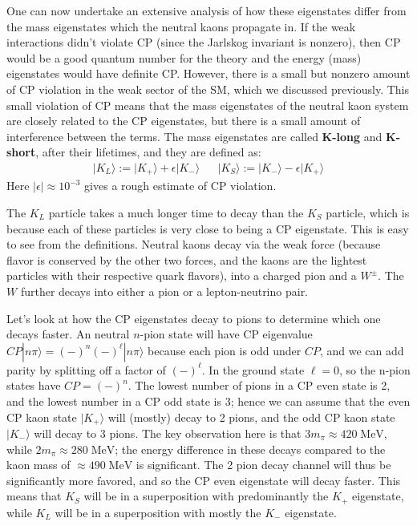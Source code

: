 \documentclass[11pt, oneside]{article}   	%
\theoremstyle{definition}
\numberwithin{equation}{subsection}		%
\begin{document}
One can now undertake an extensive analysis of how these eigenstates differ from the mass eigenstates which the neutral kaons propagate in. 
If the weak interactions didn't violate CP 
(since the Jarlskog invariant is nonzero), then CP would be a good quantum number for the theory and the energy (mass) eigenstates would 
have definite CP. However, there is a small but nonzero amount of CP violation in the weak sector of the SM, which we discussed previously. 
This small violation of CP means that the mass eigenstates of the neutral kaon system are closely related to the CP eigenstates, but there is a 
small amount of interference between the terms.
The mass eigenstates are called \textbf{K-long} and \textbf{K-short}, after their lifetimes, and they are defined as:
\begin{align}
	|K_L\rangle := |K_+\rangle + \epsilon |K_-\rangle && |K_S\rangle := |K_-\rangle - \epsilon |K_+\rangle
\end{align}
Here $|\epsilon|\approx 10^{-3}$ gives a rough estimate of CP violation.

The $K_L$ particle takes a much longer time to decay than the $K_S$ particle, which is because each of these 
particles is very close to being a CP eigenstate. This is easy to see from the definitions. Neutral kaons decay via 
the weak force (because flavor is conserved by the other two forces, and the kaons are the lightest particles with their respective 
quark flavors), into a charged pion and a $W^\pm$. The $W$ further decays into either a pion or a lepton-neutrino pair. 

Let's look at how the CP eigenstates decay to pions to determine which one decays faster. An neutral $n$-pion state will have 
CP eigenvalue $CP|n\pi\rangle = (-)^n (-)^\ell |n\pi\rangle$ because each pion is odd under $CP$, and we can add parity by 
splitting off a factor of $(-)^\ell$. In the ground state $\ell = 0$, so the n-pion states have $CP = (-)^n$. The lowest number 
of pions in a CP even state is 2, and the lowest number in a CP odd state is 3; hence we can assume that the 
even CP kaon state $|K_+\rangle$ will (mostly) decay to 2 pions, and the odd CP kaon state $|K_-\rangle$ will decay to 3 pions. 
The key observation here is that $3 m_\pi\approx 420\;\mathrm{MeV}$, while $2 m_\pi\approx 280\;\mathrm{MeV}$; the energy 
difference in these decays compared to the kaon mass of $\approx 490\;\mathrm{MeV}$ is significant. The 2 pion decay channel will 
thus be significantly more favored, and so the CP even eigenstate will decay faster. This means that $K_S$ will be in a superposition 
with predominantly the $K_+$ eigenstate, while $K_L$ will be in a superposition with mostly the $K_-$ eigenstate. 
\end{document}
